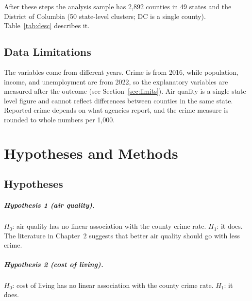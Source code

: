 \documentclass[12pt,letterpaper]{report}
\begin{document}
After these steps the analysis sample has 2,892 counties in 49 states and the District of
Columbia (50 state-level clusters; DC is a single county). Table~\ref{tab:desc} describes it.

\begin{table}[H]
\centering
\caption{Descriptive statistics, analysis sample of counties.}
\label{tab:desc}
\small

\end{table}

\section{Data Limitations}
The variables come from different years. Crime is from 2016, while population, income, and
unemployment are from 2022, so the explanatory variables are measured after the outcome
(see Section~\ref{sec:limits}). Air quality is a single state-level figure and cannot reflect
differences between counties in the same state. Reported crime depends on what agencies
report, and the crime measure is rounded to whole numbers per 1,000.

\chapter{Hypotheses and Methods}

\section{Hypotheses}
\paragraph{Hypothesis 1 (air quality).} $H_0$: air quality has no linear association with
the county crime rate. $H_1$: it does. The literature in Chapter~2 suggests that better air
quality should go with less crime.

\paragraph{Hypothesis 2 (cost of living).} $H_0$: cost of living has no linear association
with the county crime rate. $H_1$: it does.
\end{document}

